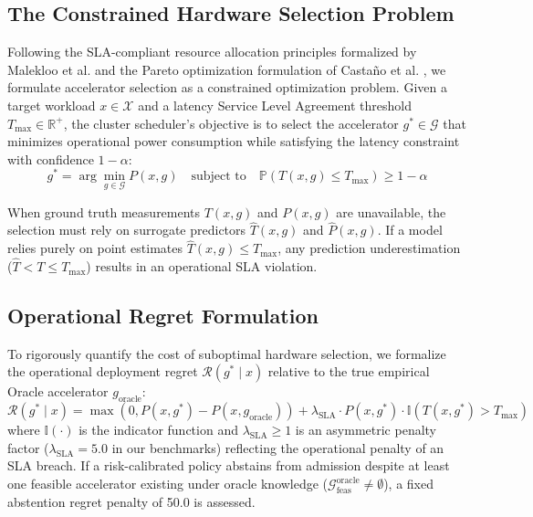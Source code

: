 \documentclass[preprint,12pt]{elsarticle}
\begin{document}
\subsection{The Constrained Hardware Selection Problem}
Following the SLA-compliant resource allocation principles formalized by Malekloo et al. \citep{suscom_malekloo2018} and the Pareto optimization formulation of Casta{\~n}o et al. \citep{suscom_multiobj2026}, we formulate accelerator selection as a constrained optimization problem. Given a target workload $x \in \mathcal{X}$ and a latency Service Level Agreement threshold $T_{\max} \in \mathbb{R}^+$, the cluster scheduler's objective is to select the accelerator $g^* \in \mathcal{G}$ that minimizes operational power consumption while satisfying the latency constraint with confidence $1 - \alpha$:
\begin{equation}
\label{eq:opt_problem}
g^* = \arg\min_{g \in \mathcal{G}} P(x, g) \quad \text{subject to} \quad \mathbb{P}\left(T(x, g) \le T_{\max}\right) \ge 1 - \alpha
\end{equation}

When ground truth measurements $T(x, g)$ and $P(x, g)$ are unavailable, the selection must rely on surrogate predictors $\hat{T}(x, g)$ and $\hat{P}(x, g)$. If a model relies purely on point estimates $\hat{T}(x, g) \le T_{\max}$, any prediction underestimation ($\hat{T} < T \le T_{\max}$) results in an operational SLA violation. 

\subsection{Operational Regret Formulation}
To rigorously quantify the cost of suboptimal hardware selection, we formalize the operational deployment regret $\mathcal{R}(g^* \mid x)$ relative to the true empirical Oracle accelerator $g_{\text{oracle}}$:
\begin{equation}
\label{eq:regret}
\mathcal{R}(g^* \mid x) = \max\left(0, P(x, g^*) - P(x, g_{\text{oracle}})\right) + \lambda_{\text{SLA}} \cdot P(x, g^*) \cdot \mathbb{I}\left(T(x, g^*) > T_{\max}\right)
\end{equation}
where $\mathbb{I}(\cdot)$ is the indicator function and $\lambda_{\text{SLA}} \ge 1$ is an asymmetric penalty factor ($\lambda_{\text{SLA}} = 5.0$ in our benchmarks) reflecting the operational penalty of an SLA breach. If a risk-calibrated policy abstains from admission despite at least one feasible accelerator existing under oracle knowledge ($\mathcal{G}_{\text{feas}}^{\text{oracle}} \neq \emptyset$), a fixed abstention regret penalty of 50.0 is assessed.
\end{document}
